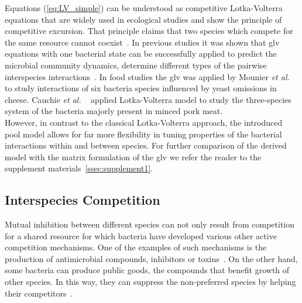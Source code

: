 \documentclass[10pt,twocolumn,5p]{elsarticle}
\numberwithin{equation}{section}
\newcommand{\etal}{{\textit{et al. }}}
\begin{document}
%
Equations (\ref{eq:LV_simple}) can be understood as competitive Lotka-Volterra equations that are widely used in ecological studies and show the principle of competitive excursion.
That principle claims that two species which compete for the same resource cannot coexist~\cite{wangersky_lotka-volterra_1978}.
In previous studies it was shown that \ac{glv} equations with one bacterial state can be successfully applied to predict the microbial community dynamics, determine different types of the pairwise interspecies interactions~\cite{dedrick_when_2023, stein_ecological_2013, venturelli_deciphering_2018, hoffmann_power_2007}.
In food studies the \ac{glv} was applied by Mounier \etal~\cite{mounier_microbial_2008} to study interactions of six bacteria species influenced by yeast omissions in cheese.
Cauchie \etal~\cite{cauchie_modeling_2020} applied Lotka-Volterra model to study the three-species system of the bacteria majorly present in minced pork meat.\\
%
However, in contrast to the classical Lotka-Volterra approach, the introduced pool model allows for far more flexibility in tuning properties of the bacterial interactions within and between species.
For further comparison of the derived model with the matrix formulation of the \ac{glv} we refer the reader to the supplement materials~\ref{ssec:supplement1}.
%
%
%
\subsection{Interspecies Competition}
Mutual inhibition between different species can not only result from competition for a shared resource for which bacteria have developed various other active competition mechanisms.
One of the examples of such mechanisms is the production of antimicrobial compounds, inhibitors or toxins~\cite{wloch-salamon_effect_2008, chao_structured_1981}.
On the other hand, some bacteria can produce public goods, the compounds that benefit growth of other species.
In this way, they can suppress the non-preferred species by helping their competitors~\cite{hibbing_bacterial_2010}.
%
%
\end{document}

